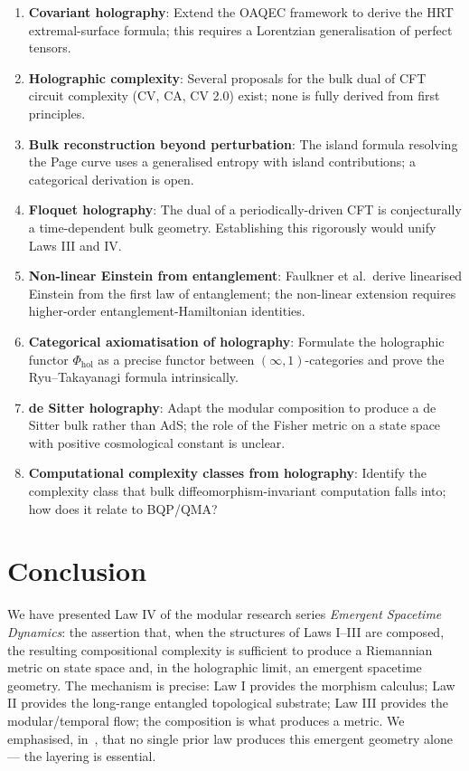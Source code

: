 \documentclass[12pt]{article}
\theoremstyle{definition}
\theoremstyle{remark}
\begin{document}
\begin{enumerate}
  \item \textbf{Covariant holography}: Extend the OAQEC framework to derive the HRT extremal-surface formula; this requires a Lorentzian generalisation of perfect tensors.
  \item \textbf{Holographic complexity}: Several proposals for the bulk dual of CFT circuit complexity (CV, CA, CV 2.0) exist; none is fully derived from first principles.
  \item \textbf{Bulk reconstruction beyond perturbation}: The island formula resolving the Page curve uses a generalised entropy with island contributions; a categorical derivation is open.
  \item \textbf{Floquet holography}: The dual of a periodically-driven CFT is conjecturally a time-dependent bulk geometry. Establishing this rigorously would unify Laws III and IV.
  \item \textbf{Non-linear Einstein from entanglement}: Faulkner et al.\ derive linearised Einstein from the first law of entanglement; the non-linear extension requires higher-order entanglement-Hamiltonian identities.
  \item \textbf{Categorical axiomatisation of holography}: Formulate the holographic functor $\Phi_{\mathrm{hol}}$ as a precise functor between $(\infty,1)$-categories and prove the Ryu--Takayanagi formula intrinsically.
  \item \textbf{de Sitter holography}: Adapt the modular composition to produce a de Sitter bulk rather than AdS; the role of the Fisher metric on a state space with positive cosmological constant is unclear.
  \item \textbf{Computational complexity classes from holography}: Identify the complexity class that bulk diffeomorphism-invariant computation falls into; how does it relate to BQP/QMA?
\end{enumerate}

\section{Conclusion}
\label{sec:conclusion}

We have presented Law IV of the modular research series \emph{Emergent Spacetime Dynamics}: the assertion that, when the structures of Laws I--III are composed, the resulting compositional complexity is sufficient to produce a Riemannian metric on state space and, in the holographic limit, an emergent spacetime geometry. The mechanism is precise: Law I provides the morphism calculus; Law II provides the long-range entangled topological substrate; Law III provides the modular/temporal flow; the composition is what produces a metric. We emphasised, in~, that no single prior law produces this emergent geometry alone --- the layering is essential.
\end{document}
